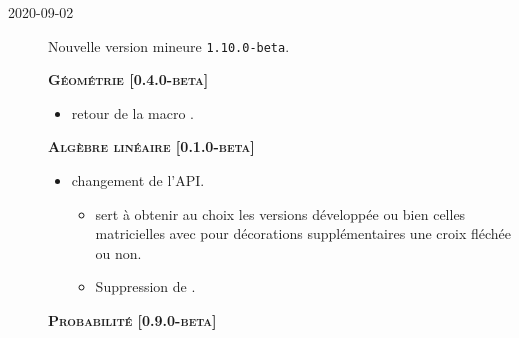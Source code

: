 \documentclass[12pt,a4paper]{book}
\begin{document}
\begin{description}
    
    \separation


    \medskip
    \item[2020-09-02] Nouvelle version mineure \verb+1.10.0-beta+.
    
    
    
    
    \begin{center}
        \textbf{\textsc{Géométrie [0.4.0-beta]}}
    \end{center}
    
    \begin{itemize}[itemsep=.5em]
        \item {}
              retour de la macro .
    
    
    \end{itemize}
    
    
    \separation
    
    
    
    
    \begin{center}
        \textbf{\textsc{Algèbre linéaire [0.1.0-beta]}}
    \end{center}
    
    \begin{itemize}[itemsep=.5em]
        \item {} changement de l'API.
        \begin{itemize}[itemsep=.5em]
            \item {} sert à obtenir au choix les versions développée ou bien celles matricielles avec pour décorations supplémentaires une croix fléchée ou non.
    
            \item Suppression de .
        \end{itemize}
    
    
    \end{itemize}
    
    
    \separation
    
    
    
    
    \begin{center}
        \textbf{\textsc{Probabilité [0.9.0-beta]}}
    \end{center}
    

\end{description}
\end{document}
